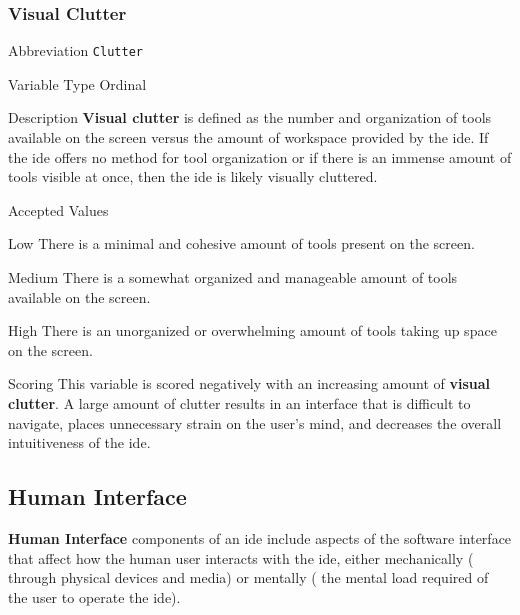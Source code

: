 \subsubsection{Visual Clutter}
\label{subsubsec:clutter}

\begin{AlignedDesc}
  \item[Abbreviation] \texttt{Clutter}

  \item[Variable Type] Ordinal

  \item[Description] \textbf{Visual clutter} is defined as the number
  and organization of tools available on the screen versus the amount of
  workspace provided by the \ac{ide}. If the \ac{ide} offers no method for
  tool organization or if there is an immense amount of tools visible at
  once, then the \ac{ide} is likely visually cluttered.

  \item[Accepted Values]

  \begin{AlignedDesc}
    \item[Low] There is a minimal and cohesive amount of tools present on
      the screen.
    \item[Medium] There is a somewhat organized and manageable amount of
    tools available on the screen.
    \item[High] There is an unorganized or overwhelming amount of tools
    taking up space on the screen.
  \end{AlignedDesc}

  \item[Scoring] This variable is scored negatively with an increasing
  amount of \textbf{visual clutter}. A large amount of clutter results in
  an interface that is difficult to navigate, places unnecessary strain on
  the user's mind, and decreases the overall intuitiveness of the \ac{ide}.

\end{AlignedDesc}


\subsection{Human Interface}
\label{subsec:humaninterface}

\textbf{Human Interface} components of an \ac{ide} include aspects of the
software interface that affect how the human user interacts with the \ac{ide},
either mechanically (\eg{} through physical devices and media) or
mentally (\eg{} the mental load required of the user to operate the
\ac{ide}).

